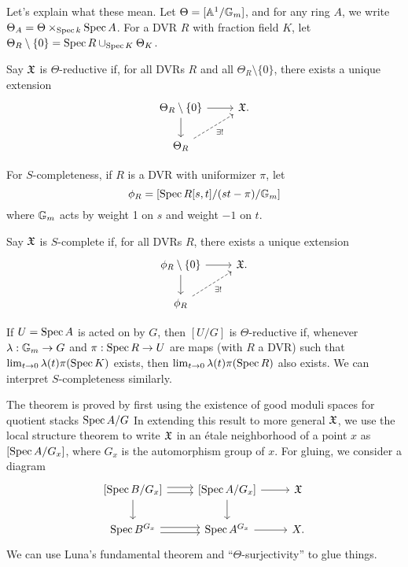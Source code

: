 \documentclass{amsart}
\begin{document}
Let's explain what these mean.
Let $\Theta = [\mathbb{A}^1 / \mathbb{G}_m]$, and for any ring $A$, we write $\Theta_A = \Theta \times_{\operatorname{Spec} k} \operatorname{Spec} A$.
For a DVR $R$ with fraction field $K$, let $\Theta_R \setminus \{0\} = \operatorname{Spec} R \cup_{\operatorname{Spec} K} \Theta_K$.

\begin{dfn}
	Say $\mathfrak{X}$ is $\Theta$-reductive if, for all DVRs $R$ and all $\Theta_R \setminus \{0\}$, there exists a unique extension
	\[
		\begin{tikzcd}
			\Theta_R \setminus \{0\} \rar \dar & \Xfr. \\ 
			\Theta_R \ar[ur, dashed, "\exists !", swap] &
		\end{tikzcd}
	\]
\end{dfn}

For $S$-completeness, if $R$ is a DVR with uniformizer $\pi$, let
\[
	\phi_R = [\operatorname{Spec} R[s, t] / (st - \pi) / \mathbb{G}_m]
\]
where $\mathbb{G}_m$ acts by weight 1 on $s$ and weight $-1$ on $t$.

\begin{dfn}
	Say $\mathfrak{X}$ is $S$-complete if, for all DVRs $R$, there exists a unique extension
	\[
		\begin{tikzcd}
			\phi_R \setminus \{0\} \rar \dar & \Xfr. \\
			\phi_R \ar[ur, dashed, "\exists !", swap] &
		\end{tikzcd}
	\]
\end{dfn}

\begin{ex}
	If $U = \operatorname{Spec} A$ is acted on by $G$, then $[U / G]$ is $\Theta$-reductive if, whenever $\lambda: \mathbb{G}_m \to G$ and $\pi: \operatorname{Spec} R \to U$ are maps (with $R$ a DVR) such that $\lim_{t \to 0} \lambda(t) \pi(\operatorname{Spec} K)$ exists, then $\lim_{t \to 0} \lambda(t) \pi(\operatorname{Spec} R)$ also exists.
	We can interpret $S$-completeness similarly.
\end{ex}

The theorem is proved by first using the existence of good moduli spaces for quotient stacks $\operatorname{Spec} A / G$
In extending this result to more general $\mathfrak{X}$, we use the local structure theorem to write $\mathfrak{X}$ in an \'etale neighborhood of a point $x$ as $[\operatorname{Spec} A / G_x]$, where $G_x$ is the automorphism group of $x$.
For gluing, we consider a diagram
\[
	\begin{tikzcd}
		{[\Spec B / G_x]} \ar[r, shift right] \ar[r, shift left] \dar & {[\Spec A / G_x]} \rar \dar & \Xfr \\
		\Spec B^{G_x} \ar[r, shift right] \ar[r, shift left] & \Spec A^{G_x} \rar & X.
	\end{tikzcd}
\]
We can use Luna's fundamental theorem and ``$\Theta$-surjectivity'' to glue things.
\end{document}
